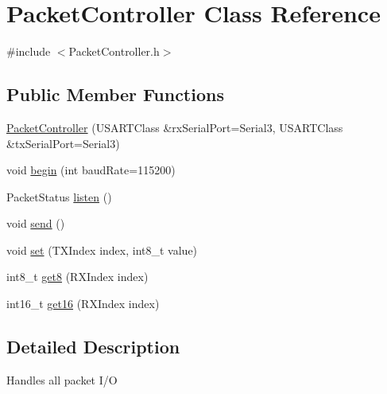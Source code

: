 \hypertarget{class_packet_controller}{\section{Packet\+Controller Class Reference}
\label{class_packet_controller}
}


{\ttfamily \#include $<$Packet\+Controller.\+h$>$}

\subsection*{Public Member Functions}
\begin{DoxyCompactItemize}
\item 
\hyperlink{class_packet_controller_ac64f16775ce7037811c7ddb96840bb55}{Packet\+Controller} (U\+S\+A\+R\+T\+Class \&rx\+Serial\+Port=Serial3, U\+S\+A\+R\+T\+Class \&tx\+Serial\+Port=Serial3)
\item 
void \hyperlink{class_packet_controller_a837520371e028d11425aabe120ba4d3d}{begin} (int baud\+Rate=115200)
\item 
Packet\+Status \hyperlink{class_packet_controller_a1cb73e40893a34761227cefdfa35a0cf}{listen} ()
\item 
void \hyperlink{class_packet_controller_a9d512cbc5b824c0bb424a95fd73bf648}{send} ()
\item 
void \hyperlink{class_packet_controller_ac597c16ed3b2e8455d4fafe850b456ee}{set} (T\+X\+Index index, int8\+\_\+t value)
\item 
int8\+\_\+t \hyperlink{class_packet_controller_aacdc7e49b324cc12b58229b1d63f0332}{get8} (R\+X\+Index index)
\item 
int16\+\_\+t \hyperlink{class_packet_controller_a7e37130fb7ea53152f055e640ebdd7ed}{get16} (R\+X\+Index index)
\end{DoxyCompactItemize}


\subsection{Detailed Description}
Handles all packet I/\+O 

